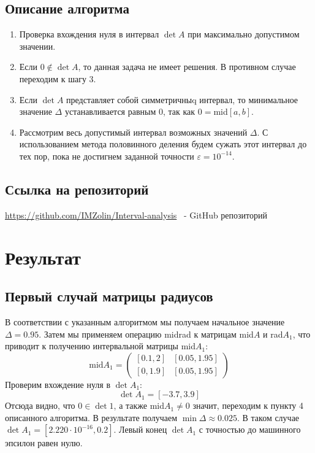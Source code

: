 \documentclass[a4paper,14pt]{article}
\begin{document}
	\subsection{Описание алгоритма}
	\begin{enumerate}
		\item Проверка вхождения нуля в интервал $\det A$ при максимально допустимом значении.
		\item Если $0 \notin \det A$, то данная задача не имеет решения. В противном случае переходим к шагу 3.
		\item Если $\det A$ представляет собой симметричныq интервал, то минимальное значение $\Delta$ устанавливается равным 0, так как
		$0 = $mid$[a, b]$.
		\item Рассмотрим весь допустимый интервал возможных значений $\Delta$. С использованием метода половинного деления будем сужать этот интервал до тех пор, пока не достигнем заданной точности $\varepsilon = 10^{-14}$.
	\end{enumerate}
	\subsection{Ссылка на репозиторий}
	\url{https://github.com/IMZolin/Interval-analysis} \ - GitHub репозиторий
	
	\section{Результат}
	\subsection{Первый случай матрицы радиусов}
	В соответствии с указанным алгоритмом мы получаем начальное значение $\Delta = 0.95$. Затем мы применяем операцию midrad к матрицам mid$A$ и rad$A_1$, что приводит к получению интервальной матрицы mid$A_1$:
	\begin{equation}
		\text{mid} A_1 = \begin{pmatrix}
			[0.1,2] & [0.05,1.95]\\ 
			[0,1.9] & [0.05,1.95]
		\end{pmatrix}
	\end{equation}
	Проверим вхождение нуля в $\det A_1$:
	\begin{equation}
		\det A_1 = [-3.7,3.9]
	\end{equation}
	Отсюда видно, что $0 \in \det 1$, а также mid$A_1 \neq 0$ значит, переходим к пункту 4 описанного алгоритма.
	В результате получаем $\min \Delta \approx 0.025$. В таком случае $\det A_1 = [2.220 · 10^{-16}, 0.2]$. Левый конец $\det A_1$
	с точностью до машинного эпсилон равен нулю.
\end{document}
